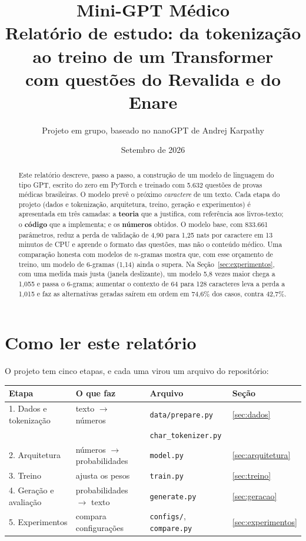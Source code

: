 \documentclass[11pt,a4paper]{article}
\title{\textbf{Mini-GPT Médico}\\[4pt]
\large Relatório de estudo: da tokenização ao treino de um Transformer\\
com questões do Revalida e do Enare}
\author{Projeto em grupo, baseado no nanoGPT de Andrej Karpathy}
\date{Setembro de 2026}
\begin{document}
\maketitle

\begin{abstract}
\noindent Este relatório descreve, passo a passo, a construção de um modelo de linguagem do tipo GPT, escrito do zero em PyTorch e treinado com 5.632 questões de provas médicas brasileiras. O modelo prevê o próximo \emph{caractere} de um texto. Cada etapa do projeto (dados e tokenização, arquitetura, treino, geração e experimentos) é apresentada em três camadas: a \textbf{teoria} que a justifica, com referência aos livros-texto; o \textbf{código} que a implementa; e os \textbf{números} obtidos. O modelo base, com 833.661 parâmetros, reduz a perda de validação de 4,90 para 1,25 nats por caractere em 13 minutos de CPU e aprende o formato das questões, mas não o conteúdo médico. Uma comparação honesta com modelos de $n$-gramas mostra que, com esse orçamento de treino, um modelo de 6-gramas (1,14) ainda o supera. Na Seção~\ref{sec:experimentos}, com uma medida mais justa (janela deslizante), um modelo 5,8 vezes maior chega a 1,055 e passa o 6-grama; aumentar o contexto de 64 para 128 caracteres leva a perda a 1,015 e faz as alternativas geradas saírem em ordem em 74,6\% dos casos, contra 42,7\%.
\end{abstract}

\tableofcontents
\newpage

\section{Como ler este relatório}

O projeto tem cinco etapas, e cada uma virou um arquivo do repositório:

\begin{center}
\begin{tabular}{@{}llll@{}}
\toprule
Etapa & O que faz & Arquivo & Seção \\
\midrule
1. Dados e tokenização & texto $\to$ números & \texttt{data/prepare.py} & \ref{sec:dados} \\
 & & \texttt{char\_tokenizer.py} & \\
2. Arquitetura & números $\to$ probabilidades & \texttt{model.py} & \ref{sec:arquitetura} \\
3. Treino & ajusta os pesos & \texttt{train.py} & \ref{sec:treino} \\
4. Geração e avaliação & probabilidades $\to$ texto & \texttt{generate.py} & \ref{sec:geracao} \\
5. Experimentos & compara configurações & \texttt{configs/}, \texttt{compare.py} & \ref{sec:experimentos} \\
\bottomrule
\end{tabular}
\end{center}
\end{document}

